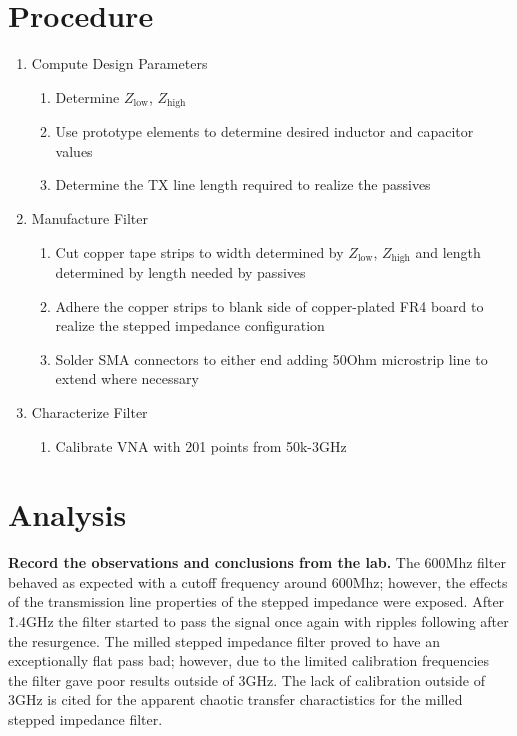 \documentclass[journal]{IEEEtran}
\begin{document}
\section{Procedure}
\begin{enumerate}
    \item Compute Design Parameters
          \begin{enumerate}
              \item Determine \(Z_{\text{low}}\), \(Z_{\text{high}}\)
              \item Use prototype elements to determine desired inductor and capacitor values
              \item Determine the TX line length required to realize the passives
          \end{enumerate}
    \item Manufacture Filter
          \begin{enumerate}
              \item Cut copper tape strips to width determined by \(Z_{\text{low}}\),
                    \(Z_{\text{high}}\)  and length determined by length needed by passives
              \item Adhere the copper strips to blank side of copper-plated FR4 board to
                    realize the stepped impedance configuration
              \item Solder SMA connectors to either end adding 50Ohm microstrip line to extend where necessary
          \end{enumerate}
    \item Characterize Filter
          \begin{enumerate}
              \item Calibrate VNA with 201 points from 50k-3GHz
          \end{enumerate}
\end{enumerate}

\section{Analysis}
\textbf{Record the observations and conclusions from the lab.}
The 600Mhz filter behaved as expected with a cutoff frequency around 600Mhz;
however, the effects of the transmission line properties of the stepped
impedance were exposed.  After \~1.4GHz the filter started to pass the signal
once again with ripples following after the resurgence. The milled stepped
impedance filter proved to have an exceptionally flat pass bad; however, due to
the limited calibration frequencies the filter gave poor results outside of
3GHz. The lack of calibration outside of 3GHz is cited for the apparent chaotic
transfer charactistics for the milled stepped impedance filter.
\end{document}
